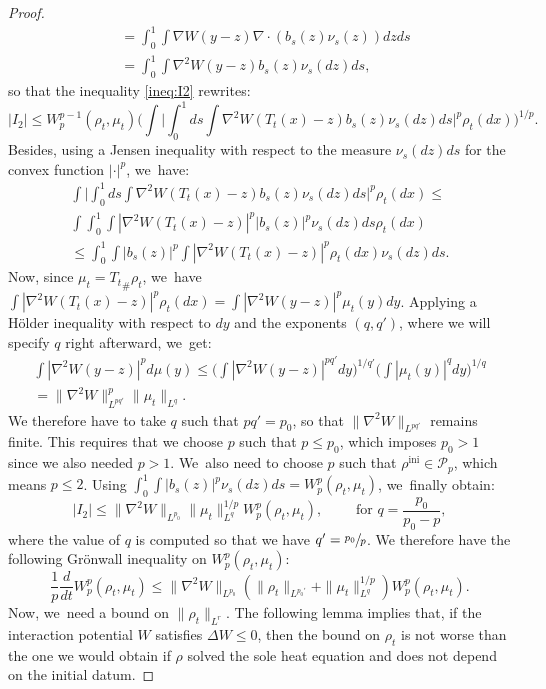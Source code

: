 \documentclass[JEP,XML,SOM,Unicode, NoFloatCountersInSection,published]{cedram}
\newcommand{\ini}{\mathrm{ini}}
\def\calP{{\mathcal P}}
\theoremstyle{plain}
\theoremstyle{definition}
\begin{document}
\begin{proof}
\begin{align*}
& = \int_0^1 \int \nabla W(y-z) \nabla \cdot (b_s(z) \nu_s(z)) dz ds \\
& = \int_0^1 \int \nabla^2 W(y-z) b_s(z) \nu_s(dz) ds,
\end{align*}
so that the inequality \eqref{ineq:I2} rewrites:
\[
|I_2| \leq W_p^{p-1}(\rho_t, \mu_t) \bigg( \int \bigg| \int_0^1 ds \int \nabla^2 W(T_t(x) - z) b_s(z) \nu_s(dz) ds \bigg|^p \rho_t(dx)\bigg)^{1/p}.
\]
Besides, using a Jensen inequality with respect to the measure $\nu_s(dz) ds$ for the convex function $|\cdot|^p$, we~have:
\begin{multline*}
\int \bigg| \int_0^1 ds \int \nabla^2 W(T_t(x) - z) b_s(z) \nu_s(dz) ds \bigg|^p \rho_t(dx) \leq \\
\int \int_0^1 \int |\nabla^2 W(T_t(x) - z)|^p |b_s(z)|^p \nu_s(dz) ds \rho_t(dx) \\
\leq \int_0^1 \int |b_s(z)|^p \int |\nabla^2 W(T_t(x) - z)|^p \rho_t(dx) \nu_s(dz) ds.
\end{multline*}
Now, since $\mu_t = {T_t}_\# \rho_t$, we~have $\int |\nabla^2 W(T_t(x) - z)|^p \rho_t(dx) = \int |\nabla^2 W(y - z)|^p \mu_t(y) dy$. Applying a Hölder inequality with respect to $dy$ and the exponents $(q,q')$, where we will specify $q$ right afterward, we~get:
\begin{multline*}
\int |\nabla^2 W(y - z)|^p d\mu(y) \leq \bigg( \int |\nabla^2 W(y - z)|^{pq'} dy \bigg)^{1/q'} \bigg( \int |\mu_t(y)|^{q} dy \bigg)^{1/q} \\
= \|\nabla^2 W\|_{L^{pq'}}^p \|\mu_t\|_{L^q}.
\end{multline*}
We therefore have to take $q$ such that $pq' = p_0$, so that $\|\nabla^2 W\|_{L^{pq'}}$ remains finite. This requires that we choose $p$ such that $p \leq p_0$, which imposes $p_0 > 1$ since we also needed $p>1$. We~also need to choose $p$ such that $\rho^{\ini}\in\calP_p$, which means $p\leq 2$. Using $\int_0^1 \int |b_s(z)|^p \nu_s(dz) ds = W_p^p(\rho_t, \mu_t)$, we~finally obtain:
\[
|I_2| \leq \|\nabla^2 W\|_{L^{p_0}} \|\mu_t\|_{L^q}^{1/p} W_p^p(\rho_t, \mu_t),\qquad\mbox{ for } q=\frac{p_0}{p_0-p},
\]
where the value of $q$ is computed so that we have $q'=\sfrac{p_0}{p}$.
We therefore have the following Grönwall inequality on $W_p^p(\rho_t, \mu_t)$:
\begin{equation}\label{ineq:GWp}
\frac 1p \frac{d}{dt} W_p^p(\rho_t, \mu_t) \leq \|\nabla^2 W\|_{L^{p_0}} \left( \|\rho_t\|_{L^{p_0'}} + \|\mu_t\|_{L^q}^{1/p} \right) W_p^p(\rho_t, \mu_t).
\end{equation}
Now, we~need a bound on $\|\rho_t\|_{L^r}$. The following lemma implies that, if the interaction potential $W$ satisfies $\Delta W \leq 0$, then the bound on $\rho_t$ is not worse than the one we would obtain if $\rho$ solved the sole heat equation and does not depend on the initial datum.

\end{proof}
\end{document}
